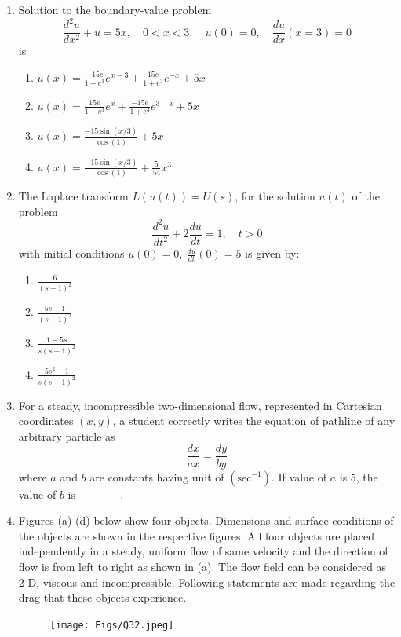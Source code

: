 \documentclass[journal]{IEEEtran}
\begin{document}
\begin{enumerate}
\item  
Solution to the boundary-value problem  
$$
\frac{d^2u}{dx^2} + u = 5x, \quad 0 < x < 3, \quad u(0) = 0, \quad \frac{du}{dx}(x=3) = 0
$$
is
\begin{enumerate}
    \item $u(x) = \frac{-15e}{1+e^3} e^{x-3} + \frac{15e}{1+e^3} e^{-x} + 5x$
    \item $u(x) = \frac{15e}{1+e^3} e^{x} + \frac{-15e}{1+e^3} e^{3-x} + 5x$
    \item $u(x) = \frac{-15\sin(x/3)}{\cos(1)} + 5x$
    \item $u(x) = \frac{-15\sin(x/3)}{\cos(1)} + \frac{5}{54} x^3$
\end{enumerate}
\hfill{}

\item  
The Laplace transform $L(u(t)) = U(s)$, for the solution $u(t)$ of the problem  
$$
\frac{d^2u}{dt^2} + 2 \frac{du}{dt} = 1, \quad t > 0
$$
with initial conditions $u(0) = 0, \ \frac{du}{dt}(0) = 5$ is given by:
\begin{enumerate}
    \item $\frac{6}{(s+1)^2}$
    \item $\frac{5s+1}{(s+1)^2}$
    \item $\frac{1-5s}{s(s+1)^2}$
    \item $\frac{5s^2 + 1}{s(s+1)^2}$
\end{enumerate}
\hfill{}

\item  
For a steady, incompressible two-dimensional flow, represented in Cartesian coordinates $(x, y)$, a student correctly writes the equation of pathline of any arbitrary particle as  
$$
\frac{dx}{a x} = \frac{dy}{b y}
$$
where $a$ and $b$ are constants having unit of $(\text{sec}^{-1})$. If value of $a$ is $5$, the value of $b$ is \_\_\_\_\_.

\hfill{}

\item \quad Figures (a)-(d) below show four objects. Dimensions and surface conditions of the objects are shown in the respective figures. All four objects are placed independently in a steady, uniform flow of same velocity and the direction of flow is from left to right as shown in (a). The flow field can be considered as 2-D, viscous and incompressible. Following statements are made regarding the drag that these objects experience.

\begin{figure}[H]
\centering
\texttt{[image: Figs/Q32.jpeg]}
\caption{}
\end{figure}


\end{enumerate}
\end{document}
